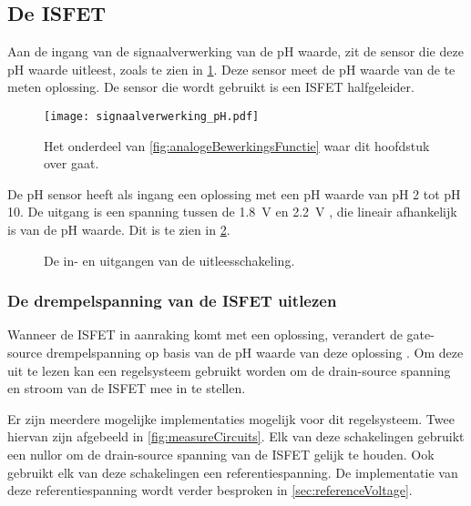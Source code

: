 \subsection{De ISFET}

Aan de ingang van de signaalverwerking van de pH waarde, zit de sensor die deze pH waarde uitleest, zoals te zien in \cref{fig:pHInSchema}. Deze sensor meet de pH waarde van de te meten oplossing. De sensor die wordt gebruikt is een ISFET halfgeleider.
\begin{figure}[!htbp]
    \centering
    \texttt{[image: signaalverwerking\_pH.pdf]}
    \caption{Het onderdeel van \cref{fig:analogeBewerkingsFunctie} waar dit hoofdstuk over gaat.}
    \label{fig:pHInSchema}
\end{figure}

De pH sensor heeft als ingang een oplossing met een pH waarde van pH 2 tot pH 10. De uitgang is een spanning tussen de \qty{1.8}{\volt} en \qty{2.2}{\volt} \cite{isfet}, die lineair afhankelijk is van de pH waarde. Dit is te zien in \cref{fig:uitleesBlok}.

\begin{figure}[!htbp]
    \centering
    \def\svgwidth{0.4\textwidth}
    
    \caption{De in- en uitgangen van de uitleesschakeling.}
    \label{fig:uitleesBlok}
\end{figure}


\subsubsection{De drempelspanning van de ISFET uitlezen} \label{sec:ISFETLees}
Wanneer de ISFET in aanraking komt met een oplossing, verandert de gate-source drempelspanning op basis van de pH waarde van deze oplossing \cite{iontjes}. Om deze uit te lezen kan een regelsysteem gebruikt worden om de drain-source spanning en stroom van de ISFET mee in te stellen.

Er zijn meerdere mogelijke implementaties mogelijk voor dit regelsysteem. Twee hiervan zijn afgebeeld in \cref{fig:measureCircuits}.
Elk van deze schakelingen gebruikt een nullor om de drain-source spanning van de ISFET gelijk te houden. Ook gebruikt elk van deze schakelingen een referentiespanning. De implementatie van deze referentiespanning wordt verder besproken in \cref{sec:referenceVoltage}.

